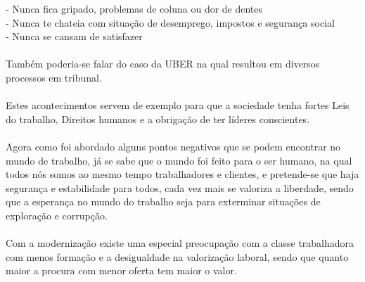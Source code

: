 \hspace*{.5cm} - Nunca fica gripado, problemas de coluna ou dor de dentes\\
\hspace*{.5cm} - Nunca te chateia com situação de desemprego, impostos e segurança social\\
\hspace*{.5cm} - Nunca se cansam de satisfazer\\
\\
Também poderia-se falar do caso da UBER na qual resultou em diversos processos em tribunal.\\
\\ 
Estes acontecimentos servem de exemplo para que a sociedade tenha fortes Leis do trabalho, Direitos humanos e a obrigação de ter líderes conscientes.\\
\\
Agora como foi abordado alguns pontos negativos que se podem encontrar no mundo de trabalho, já se sabe que o mundo foi feito para o ser humano, na qual todos nós somos ao mesmo tempo trabalhadores e clientes, e pretende-se que haja segurança e estabilidade para todos, cada vez mais se valoriza a liberdade, sendo que a esperança no mundo do trabalho seja para exterminar situações de exploração e corrupção.\\
\\
Com a modernização existe uma especial preocupação com a classe trabalhadora com menos formação e a desigualdade na valorização laboral, sendo que quanto maior a procura com menor oferta tem maior o valor.
\newpage
